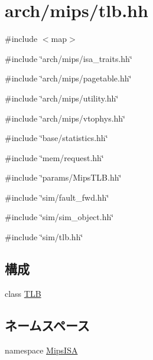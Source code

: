 \hypertarget{arch_2mips_2tlb_8hh}{
\section{arch/mips/tlb.hh}
\label{arch_2mips_2tlb_8hh}
}
{\ttfamily \#include $<$map$>$}\par
{\ttfamily \#include \char`\"{}arch/mips/isa\_\-traits.hh\char`\"{}}\par
{\ttfamily \#include \char`\"{}arch/mips/pagetable.hh\char`\"{}}\par
{\ttfamily \#include \char`\"{}arch/mips/utility.hh\char`\"{}}\par
{\ttfamily \#include \char`\"{}arch/mips/vtophys.hh\char`\"{}}\par
{\ttfamily \#include \char`\"{}base/statistics.hh\char`\"{}}\par
{\ttfamily \#include \char`\"{}mem/request.hh\char`\"{}}\par
{\ttfamily \#include \char`\"{}params/MipsTLB.hh\char`\"{}}\par
{\ttfamily \#include \char`\"{}sim/fault\_\-fwd.hh\char`\"{}}\par
{\ttfamily \#include \char`\"{}sim/sim\_\-object.hh\char`\"{}}\par
{\ttfamily \#include \char`\"{}sim/tlb.hh\char`\"{}}\par
\subsection*{構成}
\begin{DoxyCompactItemize}
\item 
class \hyperlink{classMipsISA_1_1TLB}{TLB}
\end{DoxyCompactItemize}
\subsection*{ネームスペース}
\begin{DoxyCompactItemize}
\item 
namespace \hyperlink{namespaceMipsISA}{MipsISA}
\end{DoxyCompactItemize}
